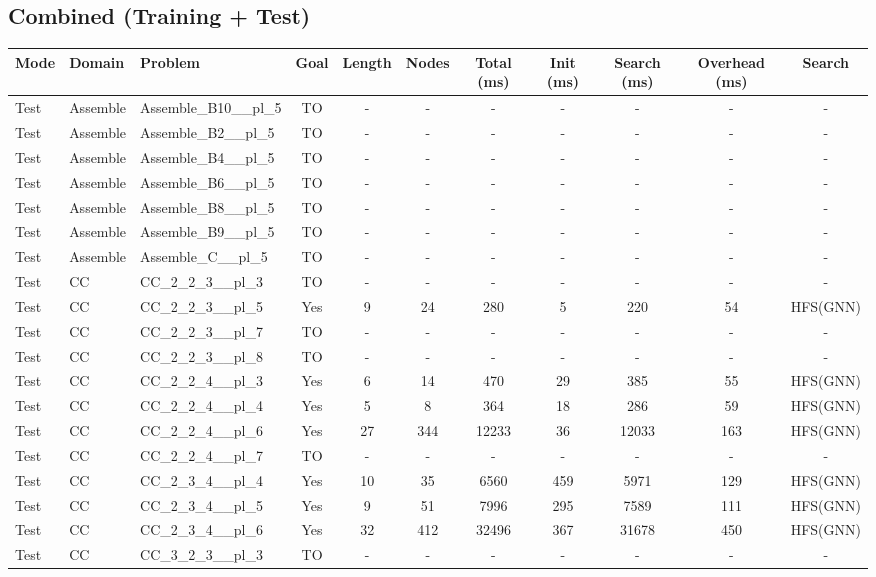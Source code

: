 \documentclass{article}
\begin{document}
\subsection*{Combined (Training + Test)}
\begin{tabular}{lllcccccccc}
\toprule
Mode & Domain & Problem & Goal & Length & Nodes & Total (ms) & Init (ms) & Search (ms) & Overhead (ms) & Search \\
\midrule
Test & Assemble & Assemble\_B10\_\_pl\_5 & TO & - & - & - & - & - & - & - \\
Test & Assemble & Assemble\_B2\_\_pl\_5 & TO & - & - & - & - & - & - & - \\
Test & Assemble & Assemble\_B4\_\_pl\_5 & TO & - & - & - & - & - & - & - \\
Test & Assemble & Assemble\_B6\_\_pl\_5 & TO & - & - & - & - & - & - & - \\
Test & Assemble & Assemble\_B8\_\_pl\_5 & TO & - & - & - & - & - & - & - \\
Test & Assemble & Assemble\_B9\_\_pl\_5 & TO & - & - & - & - & - & - & - \\
Test & Assemble & Assemble\_C\_\_pl\_5 & TO & - & - & - & - & - & - & - \\
Test & CC & CC\_2\_2\_3\_\_pl\_3 & TO & - & - & - & - & - & - & - \\
Test & CC & CC\_2\_2\_3\_\_pl\_5 & Yes & 9 & 24 & 280 & 5 & 220 & 54 & HFS(GNN) \\
Test & CC & CC\_2\_2\_3\_\_pl\_7 & TO & - & - & - & - & - & - & - \\
Test & CC & CC\_2\_2\_3\_\_pl\_8 & TO & - & - & - & - & - & - & - \\
Test & CC & CC\_2\_2\_4\_\_pl\_3 & Yes & 6 & 14 & 470 & 29 & 385 & 55 & HFS(GNN) \\
Test & CC & CC\_2\_2\_4\_\_pl\_4 & Yes & 5 & 8 & 364 & 18 & 286 & 59 & HFS(GNN) \\
Test & CC & CC\_2\_2\_4\_\_pl\_6 & Yes & 27 & 344 & 12233 & 36 & 12033 & 163 & HFS(GNN) \\
Test & CC & CC\_2\_2\_4\_\_pl\_7 & TO & - & - & - & - & - & - & - \\
Test & CC & CC\_2\_3\_4\_\_pl\_4 & Yes & 10 & 35 & 6560 & 459 & 5971 & 129 & HFS(GNN) \\
Test & CC & CC\_2\_3\_4\_\_pl\_5 & Yes & 9 & 51 & 7996 & 295 & 7589 & 111 & HFS(GNN) \\
Test & CC & CC\_2\_3\_4\_\_pl\_6 & Yes & 32 & 412 & 32496 & 367 & 31678 & 450 & HFS(GNN) \\
Test & CC & CC\_3\_2\_3\_\_pl\_3 & TO & - & - & - & - & - & - & - \\

\end{tabular}
\end{document}
